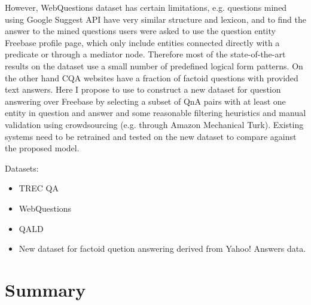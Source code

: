 However, WebQuestions dataset has certain limitations, e.g. questions mined using Google Suggest API have very similar structure and lexicon, and to find the answer to the mined questions users were asked to use the question entity Freebase profile page,  which only include entities connected directly with a predicate or through a mediator node.
Therefore most of the state-of-the-art results on the dataset use a small number of predefined logical form patterns.
On the other hand CQA websites have a fraction of factoid questions with provided text answers.
Here I propose to use to construct a new dataset for question answering over Freebase by selecting a subset of QnA pairs with at least one entity in question and answer and some reasonable filtering heuristics and manual validation using crowdsourcing (e.g. through Amazon Mechanical Turk).
Existing systems need to be retrained and tested on the new dataset to compare against the proposed model.


Datasets:
\begin{itemize}
\item TREC QA
\item WebQuestions
\item QALD
\item New dataset for factoid quetion answering derived from Yahoo! Answers data.
\end{itemize}

\section{Summary}


